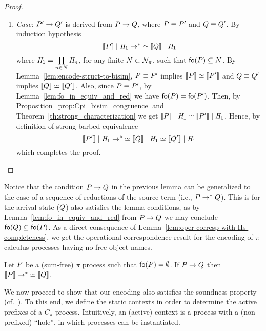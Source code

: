 \begin{proof}
\begin{enumerate}
\item \emph{Case}: $P'\rightarrow Q'$ is derived from $P\rightarrow Q$, where $P\equiv P'$ and $Q\equiv Q'$. 
By induction hypothesis%
\[
\llbracket P \rrbracket\;|\; \mathit{H}_1 \rightarrow\negthickspace^* \simeq \llbracket Q \rrbracket\;|\; \mathit{H}_1
\]
where  
$\mathit{H}_1=\prod\limits_{n\in N} \mathit{H}_{n}$, for any finite $N\subset {\cal N}_\pi$, such that $\mathsf{fo}(P)\subseteq N$.
By Lemma~\ref{lem:encode-struct-to-bisim}, $P\equiv P'$ implies 
$\llbracket P \rrbracket\simeq\llbracket P' \rrbracket$ and $Q\equiv Q'$ implies $\llbracket Q \rrbracket\simeq\llbracket Q' \rrbracket$. Also, since $P\equiv P'$, by Lemma~\ref{lem:fo_in_equiv_and_red} we have $\mathsf{fo}(P)=\mathsf{fo}(P')$.
Then, by Proposition~\ref{prop:Cpi_bisim_congruence} and Theorem~\ref{th:strong_characterization} we get 
$\llbracket P \rrbracket\;|\;\mathit{H}_1 \simeq \llbracket P' \rrbracket\;|\; \mathit{H}_1$. 
Hence, 
by definition of strong barbed equivalence 
\[
\llbracket P' \rrbracket\;|\; \mathit{H}_1 \rightarrow\negthickspace^* \simeq  \llbracket Q \rrbracket\;|\; \mathit{H}_1 \simeq \llbracket Q' \rrbracket\;|\; \mathit{H}_1
\] 
which completes the proof.
\end{enumerate}
\end{proof}

Notice that the condition $P\rightarrow Q$ in the previous lemma can be generalized to the case of a sequence of reductions of the source term (i.e., $P\rightarrow\negthickspace^*\;Q$). This is for the arrival state ($Q$) also satisfies the lemma conditions, as by Lemma~\ref{lem:fo_in_equiv_and_red} from $P\rightarrow Q$ we may conclude $\mathsf{fo}(Q)\subseteq\mathsf{fo}(P)$. 
As a direct consequence of Lemma~\ref{lem:oper-corresp-with-Hs-completeness}, we get the operational correspondence result for the encoding of $\pi$-calculus processes having no free object names.

\begin{corollary}\label{theorem:operational-corresp}
Let $P$ be a (sum-free) $\pi$ process such that $\mathsf{fo}(P)=\emptyset$. 
If $P\rightarrow Q$ then $\llbracket P \rrbracket\rightarrow\negthickspace^* \simeq\llbracket Q \rrbracket$. %
\end{corollary}




We now proceed to show that our encoding also satisfies the soundness property (cf.~\cite{DBLP:journals/iandc/Gorla10}). 
To this end, we define the static contexts in order to determine the active prefixes of a $C_\pi$ process. Intuitively, an (active) context is a process with a (non-prefixed) ``hole'', in which processes can be instantiated. 

